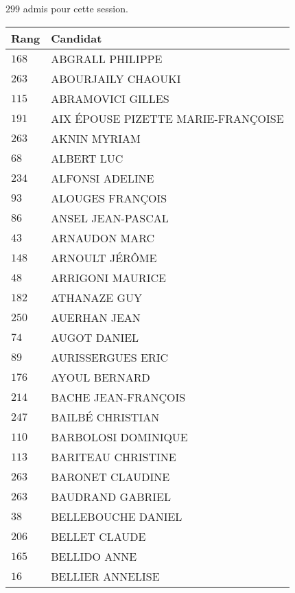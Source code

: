 



  $299$ admis pour cette session.

  \begin{xltabular}{\linewidth}{|l|X|}
    \hline
    \textbf{Rang} & \textbf{Candidat} \\
    \hline
    $168$ & ABGRALL PHILIPPE \\
    \hline
    $263$ & ABOURJAILY CHAOUKI \\
    \hline
    $115$ & ABRAMOVICI GILLES \\
    \hline
    $191$ & AIX ÉPOUSE PIZETTE MARIE-FRANÇOISE \\
    \hline
    $263$ & AKNIN MYRIAM \\
    \hline
    $68$ & ALBERT LUC \\
    \hline
    $234$ & ALFONSI ADELINE \\
    \hline
    $93$ & ALOUGES FRANÇOIS \\
    \hline
    $86$ & ANSEL JEAN-PASCAL \\
    \hline
    $43$ & ARNAUDON MARC \\
    \hline
    $148$ & ARNOULT JÉRÔME \\
    \hline
    $48$ & ARRIGONI MAURICE \\
    \hline
    $182$ & ATHANAZE GUY \\
    \hline
    $250$ & AUERHAN JEAN \\
    \hline
    $74$ & AUGOT DANIEL \\
    \hline
    $89$ & AURISSERGUES ERIC \\
    \hline
    $176$ & AYOUL BERNARD \\
    \hline
    $214$ & BACHE JEAN-FRANÇOIS \\
    \hline
    $247$ & BAILBÉ CHRISTIAN \\
    \hline
    $110$ & BARBOLOSI DOMINIQUE \\
    \hline
    $113$ & BARITEAU CHRISTINE \\
    \hline
    $263$ & BARONET CLAUDINE \\
    \hline
    $263$ & BAUDRAND GABRIEL \\
    \hline
    $38$ & BELLEBOUCHE DANIEL \\
    \hline
    $206$ & BELLET CLAUDE \\
    \hline
    $165$ & BELLIDO ANNE \\
    \hline
    $16$ & BELLIER ANNELISE \\

\end{xltabular}
